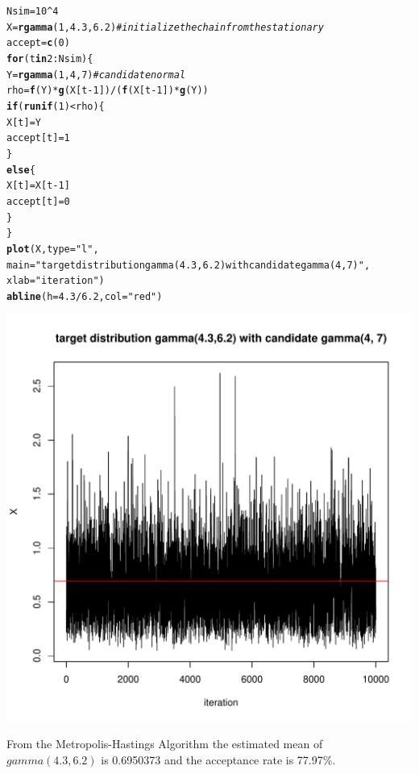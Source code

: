 \documentclass{article}\usepackage[]{graphicx}\usepackage[]{color}
\makeatletter
\newcommand{\hlnum}[1]{\textcolor[rgb]{0.686,0.059,0.569}{#1}}%
\newcommand{\hlstr}[1]{\textcolor[rgb]{0.192,0.494,0.8}{#1}}%
\newcommand{\hlcom}[1]{\textcolor[rgb]{0.678,0.584,0.686}{\textit{#1}}}%
\newcommand{\hlopt}[1]{\textcolor[rgb]{0,0,0}{#1}}%
\newcommand{\hlstd}[1]{\textcolor[rgb]{0.345,0.345,0.345}{#1}}%
\newcommand{\hlkwa}[1]{\textcolor[rgb]{0.161,0.373,0.58}{\textbf{#1}}}%
\newcommand{\hlkwb}[1]{\textcolor[rgb]{0.69,0.353,0.396}{#1}}%
\newcommand{\hlkwc}[1]{\textcolor[rgb]{0.333,0.667,0.333}{#1}}%
\newcommand{\hlkwd}[1]{\textcolor[rgb]{0.737,0.353,0.396}{\textbf{#1}}}%
\newenvironment{kframe}{%
 \def\at@end@of@kframe{}%
 \ifinner\ifhmode%
  \def\at@end@of@kframe{\end{minipage}}%
  \begin{minipage}{\columnwidth}%
 \fi\fi%
 \def\FrameCommand##1{\hskip\@totalleftmargin \hskip-\fboxsep
 \colorbox{shadecolor}{##1}\hskip-\fboxsep
     \hskip-\linewidth \hskip-\@totalleftmargin \hskip\columnwidth}%
 \MakeFramed {\advance\hsize-\width
   \@totalleftmargin\z@ \linewidth\hsize
   \@setminipage}}%
 {\par\unskip\endMakeFramed%
 \at@end@of@kframe}
\newenvironment{knitrout}{}{} %
\makeatother
\begin{document}
\begin{knitrout}
\begin{kframe}
\begin{alltt}
\hlstd{Nsim}\hlkwb{=}\hlnum{10}\hlopt{^}\hlnum{4}
\hlstd{X}\hlkwb{=}\hlkwd{rgamma}\hlstd{(}\hlnum{1}\hlstd{,} \hlnum{4.3}\hlstd{,}\hlnum{6.2}\hlstd{)}    \hlcom{# initialize the chain from the stationary}
\hlstd{accept} \hlkwb{=} \hlkwd{c}\hlstd{(}\hlnum{0}\hlstd{)}
\hlkwa{for} \hlstd{(t} \hlkwa{in} \hlnum{2}\hlopt{:}\hlstd{Nsim)\{}
  \hlstd{Y}\hlkwb{=}\hlkwd{rgamma}\hlstd{(}\hlnum{1}\hlstd{,} \hlnum{4}\hlstd{,}\hlnum{7}\hlstd{)}   \hlcom{# candidate normal}
  \hlstd{rho}\hlkwb{=}\hlkwd{f}\hlstd{(Y)}\hlopt{*}\hlkwd{g}\hlstd{(X[t}\hlopt{-}\hlnum{1}\hlstd{])}\hlopt{/}\hlstd{(}\hlkwd{f}\hlstd{(X[t}\hlopt{-}\hlnum{1}\hlstd{])}\hlopt{*}\hlkwd{g}\hlstd{(Y))}
  \hlkwa{if}\hlstd{(}\hlkwd{runif}\hlstd{(}\hlnum{1}\hlstd{)}\hlopt{<}\hlstd{rho)\{}
    \hlstd{X[t]} \hlkwb{=} \hlstd{Y}
    \hlstd{accept[t]} \hlkwb{=} \hlnum{1}
  \hlstd{\}}
  \hlkwa{else}\hlstd{\{}
    \hlstd{X[t]} \hlkwb{=}\hlstd{X[t}\hlopt{-}\hlnum{1}\hlstd{]}
    \hlstd{accept[t]} \hlkwb{=} \hlnum{0}
  \hlstd{\}}
\hlstd{\}}
\hlkwd{plot}\hlstd{(X,} \hlkwc{type} \hlstd{=} \hlstr{"l"}\hlstd{,}
     \hlkwc{main} \hlstd{=} \hlstr{"target distribution gamma(4.3,6.2) with candidate gamma(4, 7)"}\hlstd{,}
     \hlkwc{xlab} \hlstd{=} \hlstr{"iteration"}\hlstd{)}
\hlkwd{abline}\hlstd{(}\hlkwc{h} \hlstd{=} \hlnum{4.3}\hlopt{/}\hlnum{6.2}\hlstd{,} \hlkwc{col} \hlstd{=} \hlstr{"red"}\hlstd{)}
\end{alltt}
\end{kframe}
\includegraphics[width=0.60\linewidth]{figure/unnamed-chunk-2-1} 

\end{knitrout}
From the Metropolis-Hastings Algorithm the estimated mean of $gamma(4.3,6.2)$ is 0.6950373 and the acceptance rate is 77.97\%.
\end{document}
